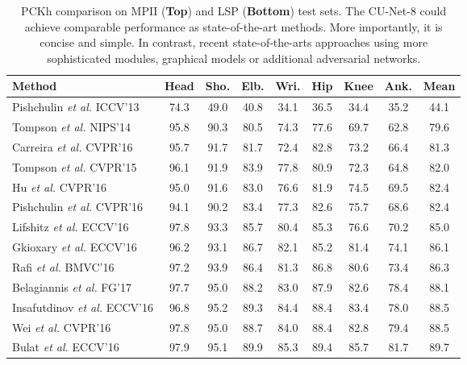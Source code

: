 \documentclass{bmvc2k}
\begin{document}
\begin{table}[t!]
\begin{center}
\small
\setlength\tabcolsep{1.5pt}
\caption{PCKh comparison on MPII ({\bf Top}) and LSP ({\bf Bottom}) test sets. The CU-Net-8 could achieve comparable performance as state-of-the-art methods. More importantly, it is concise and simple. In contrast, recent state-of-the-arts approaches using more sophisticated modules, graphical models or additional adversarial networks.}\label{tb:mpii-lsp}
\begin{tabular}{@{}lcccccccc@{}}
\toprule
Method & Head & Sho. & Elb. & Wri. & Hip & Knee & Ank. & Mean\\
\hline
Pishchulin \textit{et al.} ICCV'13 \cite{pishchulin2013strong} & 74.3 & 49.0 & 40.8 & 34.1 & 36.5 & 34.4 & 35.2 & 44.1\\
Tompson \textit{et al. } NIPS'14 \cite{tompson2014joint} & 95.8 & 90.3 & 80.5 & 74.3 & 77.6 & 69.7 & 62.8 & 79.6\\
Carreira \textit{et al.} CVPR'16 \cite{carreira2016human} & 95.7 & 91.7 & 81.7 & 72.4 & 82.8 & 73.2 & 66.4 & 81.3\\
Tompson \textit{et al.} CVPR'15 \cite{tompson2015efficient}& 96.1 & 91.9 & 83.9 & 77.8 & 80.9 & 72.3 & 64.8 & 82.0\\
Hu \textit{et al.} CVPR'16 \cite{hu2016bottom}& 95.0 & 91.6 & 83.0 & 76.6 & 81.9 & 74.5 & 69.5 & 82.4\\
Pishchulin \textit{et al.} CVPR'16 \cite{pishchulin2016deepcut}&94.1 & 90.2 & 83.4 & 77.3 & 82.6 & 75.7 & 68.6 & 82.4\\
Lifshitz \textit{et al.} ECCV'16 \cite{lifshitz2016human} & 97.8 & 93.3 & 85.7 & 80.4 & 85.3 & 76.6 & 70.2 & 85.0\\
Gkioxary \textit{et al.} ECCV'16 \cite{gkioxari2016chained} & 96.2 & 93.1 & 86.7 & 82.1 & 85.2 & 81.4 & 74.1 & 86.1\\
Rafi \textit{et al.} BMVC'16 \cite{rafi2016efficient} & 97.2 & 93.9 & 86.4 & 81.3 & 86.8 & 80.6 & 73.4 & 86.3\\
Belagiannis \textit{et al.} FG'17 \cite{belagiannis2017recurrent}&97.7 & 95.0 & 88.2 & 83.0 & 87.9 & 82.6 & 78.4 & 88.1\\
Insafutdinov \textit{et al.} ECCV'16 \cite{insafutdinov2016deepercut}&96.8 & 95.2 & 89.3 & 84.4 & 88.4 & 83.4 & 78.0 & 88.5\\
Wei \textit{et al.} CVPR'16 \cite{wei2016convolutional} & 97.8 & 95.0 & 88.7 & 84.0 & 88.4 & 82.8 & 79.4 & 88.5\\
Bulat \textit{et al.} ECCV'16 \cite{bulat2016human} & 97.9 & 95.1 & 89.9 & 85.3 & 89.4 & 85.7 & 81.7 & 89.7\\

\end{tabular}
\end{center}
\end{table}
\end{document}
